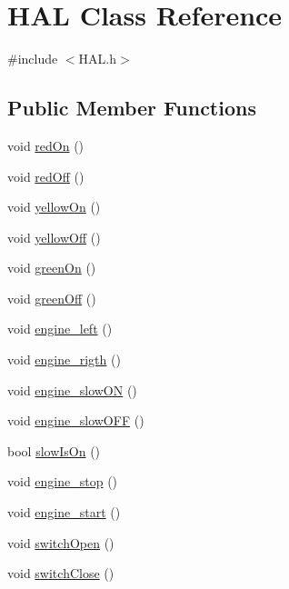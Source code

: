 \hypertarget{class_h_a_l}{\section{H\-A\-L Class Reference}
\label{class_h_a_l}
}


{\ttfamily \#include $<$H\-A\-L.\-h$>$}

\subsection*{Public Member Functions}
\begin{DoxyCompactItemize}
\item 
void \hyperlink{class_h_a_l_a9ff83439d72ca8a6052e53e256887e73}{red\-On} ()
\item 
void \hyperlink{class_h_a_l_a7ad5008f959d269c1ec08a0819f42f8d}{red\-Off} ()
\item 
void \hyperlink{class_h_a_l_a44cde8d09671df13878b6a0f13370bff}{yellow\-On} ()
\item 
void \hyperlink{class_h_a_l_ac00c6620a2fdbed2f60caded31de1c86}{yellow\-Off} ()
\item 
void \hyperlink{class_h_a_l_ae9af9ba65709973ef74f9ef21feab5e7}{green\-On} ()
\item 
void \hyperlink{class_h_a_l_a7c7cf883adc8bc8269686b4bc9807c46}{green\-Off} ()
\item 
void \hyperlink{class_h_a_l_a65320182dfa8080e067f2b50b1670fa5}{engine\-\_\-left} ()
\item 
void \hyperlink{class_h_a_l_a554579a6e7c46052377e24a4cd04a9cd}{engine\-\_\-rigth} ()
\item 
void \hyperlink{class_h_a_l_a87ee7251a47176e50c88e4a98c389567}{engine\-\_\-slow\-O\-N} ()
\item 
void \hyperlink{class_h_a_l_a3dff4d1e1b8b0c5b0b60ac7c1ca72cfc}{engine\-\_\-slow\-O\-F\-F} ()
\item 
bool \hyperlink{class_h_a_l_a28eb7a9c1846465a49384667b705f636}{slow\-Is\-On} ()
\item 
void \hyperlink{class_h_a_l_a3b46caa6b77450aa249134d3661f1885}{engine\-\_\-stop} ()
\item 
void \hyperlink{class_h_a_l_a1248c17a3ea9acd85fac3d8e2d6baf16}{engine\-\_\-start} ()
\item 
void \hyperlink{class_h_a_l_a9894ab6b4f352b40d6ed617fa0cb2021}{switch\-Open} ()
\item 
void \hyperlink{class_h_a_l_a9d0bbb1f0bdd80b226343c5823183e70}{switch\-Close} ()
\end{DoxyCompactItemize}

